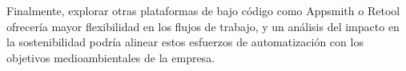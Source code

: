 \documentclass[letter,oneside,12pt,spanish]{report}
\begin{document}
\noindent Finalmente, explorar otras plataformas de bajo código como Appsmith o Retool ofrecería mayor flexibilidad en los flujos de trabajo, y un análisis del impacto en la sostenibilidad podría alinear estos esfuerzos de automatización con los objetivos medioambientales de la empresa.








\newpage

%
%

\printbibliography



\nocite{poniszewska-maranda, burns-kubernetes, torres-bosch-microservicios, armstrong2015,kubevirtio, docker2023, kubelet-doc, namespace-article}



\end{document}
